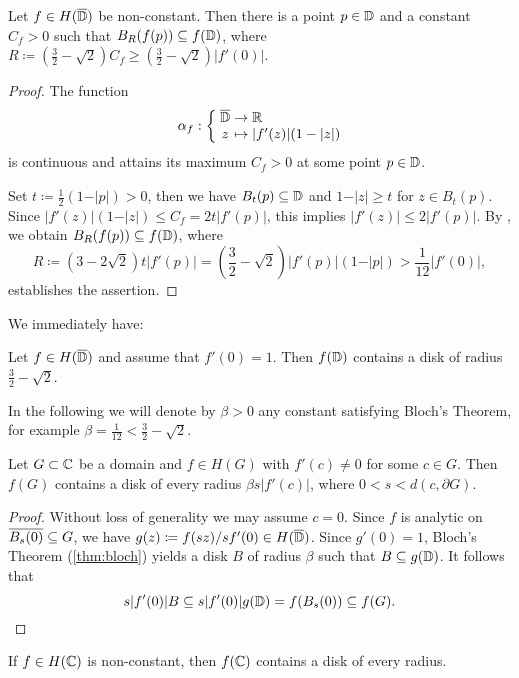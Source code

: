 \begin{theorem} \label{thm:bloch-stronger}
    Let $f \in H(\overline{\mathbb{D}})$ be non-constant. Then there is a point $p \in \mathbb{D}$ and a constant $C_f > 0$ such that $B_{R}(f(p)) \subseteq f(\mathbb{D})$, where $R \coloneqq (\frac{3}{2} - \sqrt{2}) C_f \geq (\frac{3}{2} - \sqrt{2}) \vert f'(0) \vert$.
\end{theorem}

\begin{proof}
    The function
    $$ \mapping{\alpha_f}{\cl{\D} & \to & \R}{z & \mapsto & \vert f'(z) \vert (1 - \vert z \vert)} $$
    is continuous and attains its maximum $C_f > 0$ at some point $p \in \mathbb{D}$.
    
    Set $t \coloneqq \frac{1}{2}(1 - \vert p \vert) > 0$, then we have $B_{t}(p) \subseteq \mathbb{D}$ and $1 - \vert z \vert \geq t$ for $z \in B_{t}(p)$. Since $\vert f'(z) \vert (1 - \vert z \vert) \leq C_f = 2 t \vert f'(p) \vert$, this implies $\vert f'(z) \vert \leq 2 \vert f'(p) \vert$. By , we obtain
    $ B_{R}(f(p)) \subseteq f(\mathbb{D}) $, where 
    $$ R \coloneqq (3 - 2 \sqrt{2}) t \vert f'(p) \vert = ({\textstyle \frac{3}{2}} - \sqrt{2}) \vert f'(p) \vert (1 - \vert p \vert) > {\textstyle \frac{1}{12}} \vert f'(0) \vert, $$
    establishes the assertion.
\end{proof}

We immediately have:    

\begin{theorem}[Bloch] \label{thm:bloch}
    Let $f \in H(\overline{\mathbb{D}})$ and assume that $f'(0) = 1$. Then $f(\mathbb{D})$ contains a disk of radius $\frac{3}{2} - \sqrt{2}$.
\end{theorem}

In the following we will denote by $\beta > 0$ any constant satisfying Bloch's Theorem, for example $\beta = \frac{1}{12} < \frac{3}{2} - \sqrt{2}$.

\begin{corollary} \label{cor:bloch-domain}
    Let $G \subset \mathbb{C}$ be a domain and $f \in H(G)$ with $f'(c) \neq 0$ for some $c \in G$. Then $f(G)$ contains a disk of every radius $\beta s \vert f'(c) \vert$, where $0 < s < d(c, \partial G)$.
\end{corollary}

\begin{proof}
    Without loss of generality we may assume $c = 0$. Since $f$ is analytic on $\overline{B_s(0)} \subseteq G$, we have $g(z) \coloneqq f(sz) / sf'(0) \in H(\overline{\mathbb{D}})$. Since $g'(0) = 1$, Bloch's Theorem (\ref{thm:bloch}) yields a disk $B$ of radius $\beta$ such that $B \subseteq g(\mathbb{D})$. It follows that
    \begin{equation*}
        s \vert f'(0) \vert B \subseteq s \vert f'(0) \vert g(\mathbb{D}) = f(B_s(0)) \subseteq f(G).
    \end{equation*}
\end{proof}

\begin{corollary} \label{cor:bloch-entire}
    If $f \in H(\mathbb{C})$ is non-constant, then $f(\mathbb{C})$ contains a disk of every radius.
\end{corollary}